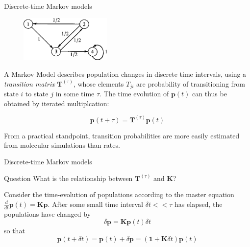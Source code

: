 \documentclass{beamer}
\begin{document}
\begin{frame}{Discrete-time Markov models}

\begin{figure}
\includegraphics[width=0.4\textwidth]{markov}
\end{figure}

A Markov Model describes population changes in discrete time intervals, using a \textit{transition matrix} $\mathbf{T}^{(\tau)}$, whose elements $T_{ji}$ are probability of transitioning from state $i$ to state $j$ in some time $\tau$.  The time evolution of $\mathbf{p}(t)$ can thus be obtained by iterated multiplcation:

$$\mathbf{p}(t+\tau) = \mathbf{T}^{(\tau)}\mathbf{p}(t)$$

From a practical standpoint, transition probabilities are more easily estimated from molecular simulations than rates.

\end{frame}



\begin{frame}{Discrete-time Markov models}

\begin{block}{Question}
What is the relationship between $\mathbf{T}^{(\tau)}$ and $\mathbf{K}$?
\end{block}

\vskip 1cm


Consider the time-evolution of populations according to the master equation $\frac{d}{dt}\mathbf{p}(t) = \mathbf{K} \mathbf{p}$. After some small time interval $\delta t << \tau$ has elapsed, the populations have changed by
$$\delta \mathbf{p} = \mathbf{K}\mathbf{p}(t) \delta t$$
so that 
$$\mathbf{p}(t+\delta t) = \mathbf{p}(t) + \delta \mathbf{p} = (\mathbf{1} + \mathbf{K} \delta t)\mathbf{p}(t)$$
\end{frame}
\end{document}

